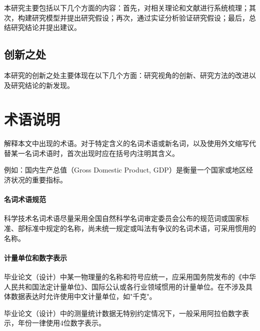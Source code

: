 本研究主要包括以下几个方面的内容：首先，对相关理论和文献进行系统梳理；其次，构建研究模型并提出研究假设；再次，通过实证分析验证研究假设；最后，总结研究结论并提出建议。

\subsection{创新之处}

本研究的创新之处主要体现在以下几个方面：研究视角的创新、研究方法的改进以及研究结论的新发现。

\section{术语说明}

解释本文中出现的术语。对于特定含义的名词术语或新名词，以及使用外文缩写代替某一名词术语时，首次出现时应在括号内注明其含义。

例如：国内生产总值（Gross Domestic Product, GDP）是衡量一个国家或地区经济状况的重要指标。

\paragraph{名词术语规范}

科学技术名词术语尽量采用全国自然科学名词审定委员会公布的规范词或国家标准、部标准中规定的名称，尚未统一规定或叫法有争议的名词术语，可采用惯用的名称。

\paragraph{计量单位和数字表示}

毕业论文（设计）中某一物理量的名称和符号应统一，应采用国务院发布的《中华人民共和国法定计量单位》、国际公认或各行业领域惯用的计量单位。在不涉及具体数据表达时允许使用中文计量单位，如"千克"。

毕业论文（设计）中的测量统计数据无特别约定情况下，一般采用阿拉伯数字表示，年份一律使用4位数字表示。
